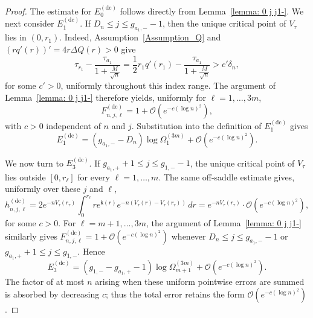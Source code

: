 \documentclass[a4paper]{article}
\numberwithin{equation}{section}
\begin{document}
\begin{proof}
The estimate for $E_0^{(\mathrm{dc})}$ follows directly from
Lemma~\ref{lemma: 0 j j1-}.  We next consider $E_1^{(\mathrm{dc})}$.
If $D_n\leq j\leq g_{a_1,-}-1$, then the unique critical point of
$V_\tau$ lies in $(0,r_1)$.  Indeed, Assumption~\ref{Assumption_Q} and
$(rq'(r))'=4r\Delta Q(r)>0$ give
\[
\tau_{r_1}-\frac{\tau_{a_1}}{1+\frac{M}{\sqrt{n}}}=\frac12 r_1q'(r_1)-\frac{\tau_{a_1}}{1+\frac{M}{\sqrt{n}}}>c'\delta_n,
\]
for some $c'>0$, uniformly throughout this index range.  The argument of
Lemma~\ref{lemma: 0 j j1-} therefore yields, uniformly for
$\ell=1,\ldots,3m$,
\[
F_{n,j,\ell}^{(\mathrm{dc})}=1+\mathcal{O}(e^{-c(\log n)^2}),   
\]
with $c>0$ independent of $n$ and $j$.  Substitution into the definition of
$E_1^{(\mathrm{dc})}$ gives
\[
E_1^{(\mathrm{dc})}
=(g_{a_1,-}-D_n)\log\Omega_1^{(3m)}+\mathcal{O}(e^{-c(\log n)^2}).
\]

We now turn to $E_3^{(\mathrm{dc})}$.  If
$g_{a_1,+}+1\leq j\leq g_{1,-}-1$, the unique critical point of
$V_\tau$ lies outside $[0,r_\ell]$ for every $\ell=1,\ldots,m$.  The same
off-saddle estimate gives, uniformly over these $j$ and $\ell$,
\[
h_{n,j,\ell}^{(\mathrm{dc})}
=2e^{-nV_{\tau}(r_{\tau})}
\int_0^{r_{\ell}}r e^{\mathsf{k}(r)}e^{-n(V_{\tau}(r)-V_{\tau}(r_{\tau}))}\,dr
=e^{-nV_{\tau}(r_{\tau})}\cdot\mathcal{O}(e^{-c(\log n)^2}),
\]
for some $c>0$.  For $\ell=m+1,\ldots,3m$, the argument of
Lemma~\ref{lemma: 0 j j1-} similarly gives
$F_{n,j,\ell}^{(\mathrm{dc})}=1+\mathcal{O}(e^{-c(\log n)^2})$ whenever
$D_n\leq j\leq g_{a_1,-}-1$ or
$g_{a_1,+}+1\leq j\leq g_{1,-}$.  Hence
\begin{equation}
E_3^{(\mathrm{dc})}
=  (g_{1,-}-g_{a_{1},+}-1)\log\Omega_{m+1}^{(3m)}+\mathcal{O}(e^{-c(\log n)^2}).
\end{equation}
The factor of at most $n$ arising when these uniform pointwise errors are
summed is absorbed by decreasing $c$; thus the total error retains the form
$\mathcal{O}(e^{-c(\log n)^2})$.


\end{proof}
\end{document}
